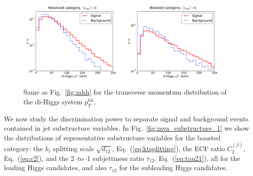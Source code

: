 \begin{figure}[t]
\begin{center}
  \includegraphics[width=0.48\textwidth]{plots/pt_HH_C2_res_noPU.pdf}
  \includegraphics[width=0.48\textwidth]{plots/pt_HH_C2_bst_noPU.pdf}
  \caption{\small Same as Fig.~\ref{fig:mhh} for the transverse momentum
    distribution of the di-Higgs system $p_T^{hh}$.
}
\label{fig:pthh}
\end{center}
\end{figure}


We now study the discrimination power to separate signal
and background events contained in
jet substructure
variables.
%
In Fig.~\ref{fig:mva_substructure_1}
we show the distributions of representative
 substructure variables for the boosted category: the
$k_t$ splitting scale $\sqrt{d_{12}}$, Eq.~(\ref{eq:ktsplitting}), 
the ECF ratio $C_2^{(\beta)}$,
Eq.~(\ref{eq:c2}), and
the 2--to--1 subjettiness ratio $\tau_{12}$, Eq.~(\ref{eq:tau21}),
all for the leading
Higgs candidates, and also $\tau_{12}$ for the subleading
Higgs candidates.

